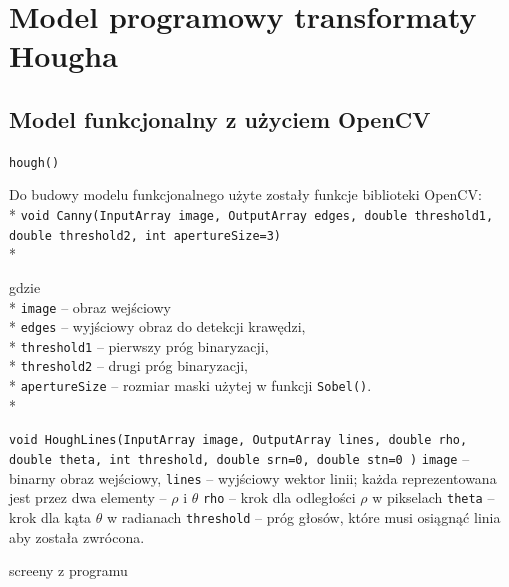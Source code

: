 \section{Model programowy transformaty Hougha}

\blindtext

\subsection{Model funkcjonalny z użyciem OpenCV}

\texttt{hough()}

Do budowy modelu funkcjonalnego użyte zostały funkcje biblioteki OpenCV:\\*
\texttt{void Canny(InputArray image, OutputArray edges, double threshold1, double threshold2, int apertureSize=3)} \\*

gdzie \\*
\texttt{image} – obraz wejściowy \\*
\texttt{edges} – wyjściowy obraz do detekcji krawędzi, \\*
\texttt{threshold1} – pierwszy próg binaryzacji,\\*
\texttt{threshold2} – drugi próg binaryzacji,\\*
\texttt{apertureSize} – rozmiar maski użytej w funkcji \texttt{Sobel()}.\\*

\texttt{void HoughLines(InputArray image, OutputArray lines, double rho, double theta, int threshold, double srn=0, double stn=0 )}
\texttt{image} – binarny obraz wejściowy,
\texttt{lines} – wyjściowy wektor linii; każda reprezentowana jest przez dwa elementy – $\rho$ i $\theta$
\texttt{rho} – krok dla odległości $\rho$ w pikselach
\texttt{theta} – krok dla kąta $\theta$ w radianach
\texttt{threshold} – próg głosów, które musi osiągnąć linia aby została zwrócona.


screeny z programu

